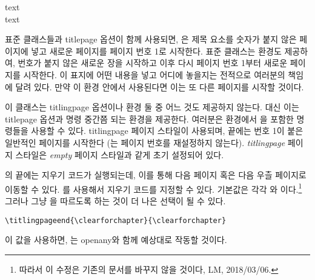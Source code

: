 \documentclass[10pt,a4paper]{oblivoir}
\begin{document}
\begin{tcolorbox}
 text  \\
 text \\
\cmd{\titlingpageend} 
\end{tcolorbox}
표준 클래스들과 \textsf{titlepage} 옵션이 함께 사용되면, \cmd{\maketitle}은
제목 요소를 숫자가 붙지 않은 페이지에 넣고 새로운 페이지를 페이지 번호 1로
시작한다.
표준 클래스는  환경도 제공하여, 번호가 붙지 않은 새로운 장을
시작하고 이후 다시 페이지 번호 1부터 새로운 페이지를 시작한다.
이 표지에 어떤 내용을 넣고 어디에 놓을지는 전적으로 여러분의 책임에 달려 있다.
만약 \cmd{\maketitle}이  환경 안에서 사용된다면 이는 또 다른
페이지를 시작할 것이다.

이 클래스는 \textsf{titlingpage} 옵션이나  환경 둘 중 어느 것도
제공하지 않는다.
대신 이는 \textsf{titlepage} 옵션과  명령 중간쯤 되는
 환경을 제공한다.
여러분은  환경에서 \cmd{\maketitle}을 포함한 명령들을 사용할
수 있다.
\textsf{titlingpage} 페이지 스타일이 사용되며, 끝에는 번호 1이 붙은 일반적인
페이지를 시작한다 (는 페이지 번호를 재설정하지 않는다).
\textsl{titlingpage} 페이지 스타일은 \textsl{empty} 페이지 스타일과 같게 초기
설정되어 있다.

의 끝에는 지우기 코드가 실행되는데, 이를 통해 다음 페이지 혹은
다음 우츨 페이지로 이동할 수 있다.
를 사용해서
지우기 코드를 지정할 수 있다.
기본값은 각각 \cmd{\cleardoublepage}와 \cmd{\clearpage}이다.\footnote{따라서 이
수정은 기존의 문서를 바꾸지 않을 것이다, LM, 2018/03/06.}
그러나 그냥 \cmd{\clearforchapter}을 따르도록 하는 것이 더 나은 선택이 될 수
있다.
\begin{verbatim}
\titlingpageend{\clearforchapter}{\clearforchapter}
\end{verbatim}
이 값을 사용하면, 는 \textsf{openany}와 함께 예상대로 작동할
것이다.
\end{document}
